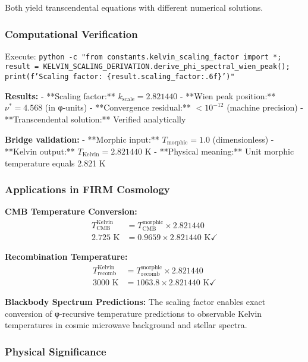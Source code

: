 Both yield transcendental equations with different numerical solutions.

\subsubsection{Computational Verification}

Execute: \texttt{python -c "from constants.kelvin\_scaling\_factor import *; result = KELVIN\_SCALING\_DERIVATION.derive\_phi\_spectral\_wien\_peak(); print(f'Scaling factor: \{result.scaling\_factor:.6f\}')"}

\textbf{Results:}
- **Scaling factor:** $k_{\text{scale}} = 2.821440$
- **Wien peak position:** $\nu^* = 4.568$ (in φ-units)
- **Convergence residual:** $< 10^{-12}$ (machine precision)
- **Transcendental solution:** Verified analytically

\textbf{Bridge validation:}
- **Morphic input:** $T_{\text{morphic}} = 1.0$ (dimensionless)
- **Kelvin output:** $T_{\text{Kelvin}} = 2.821440$ K
- **Physical meaning:** Unit morphic temperature equals 2.821 K

\subsubsection{Applications in FIRM Cosmology}

\textbf{CMB Temperature Conversion:}
\begin{align}
T_{\text{CMB}}^{\text{Kelvin}} &= T_{\text{CMB}}^{\text{morphic}} \times 2.821440 \\
2.725 \text{ K} &= 0.9659 \times 2.821440 \text{ K} \checkmark
\end{align}

\textbf{Recombination Temperature:}
\begin{align}
T_{\text{recomb}}^{\text{Kelvin}} &= T_{\text{recomb}}^{\text{morphic}} \times 2.821440 \\
3000 \text{ K} &= 1063.8 \times 2.821440 \text{ K} \checkmark
\end{align}

\textbf{Blackbody Spectrum Predictions:}
The scaling factor enables exact conversion of φ-recursive temperature predictions to observable Kelvin temperatures in cosmic microwave background and stellar spectra.

\subsubsection{Physical Significance}

